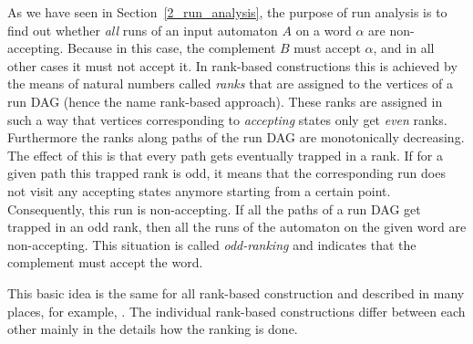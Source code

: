 As we have seen in Section~\ref{2_run_analysis}, the purpose of run analysis is to find out whether \textit{all} runs of an input automaton $A$ on a word $\alpha$ are non-accepting. Because in this case, the complement $B$ must accept $\alpha$, and in all other cases it must not accept it. In rank-based constructions this is achieved by the means of natural numbers called \textit{ranks} that are assigned to the vertices of a run DAG (hence the name rank-based approach). These ranks are assigned in such a way that vertices corresponding to \textit{accepting} states only get \textit{even} ranks. Furthermore the ranks along paths of the run DAG are monotonically decreasing. The effect of this is that every path gets eventually trapped in a rank. If for a given path this trapped rank is odd, it means that the corresponding run does not visit any accepting states anymore starting from a certain point. Consequently, this run is non-accepting. If all the paths of a run DAG get trapped in an odd rank, then all the runs of the automaton on the given word are non-accepting. This situation is called \textit{odd-ranking} and indicates that the complement must accept the word.

This basic idea is the same for all rank-based construction and described in many places, for example, \cite{fogarty2013unifying,Kupferman:2001,friedgut2006buchi,2007_vardi,2009_karmarkar,schewe2009buchi}. The individual rank-based constructions differ between each other mainly in the details how the ranking is done.



